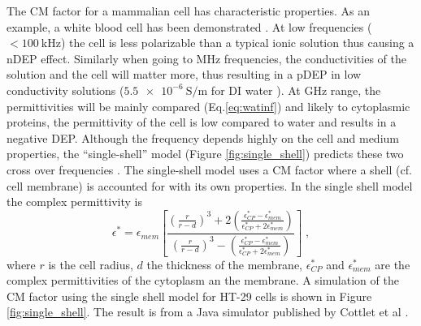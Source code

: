 \documentclass[final]{jyflluk}
\begin{document}
The CM factor for a mammalian cell has characteristic properties. As an example, a white blood cell has been demonstrated \cite{voldman_electrical_2006}. At low frequencies ($<\SI{100}{\kilo \Hz}$) the cell is less polarizable than a typical ionic solution thus causing a nDEP effect. Similarly when going to MHz frequencies, the conductivities of the solution and the cell will matter more, thus resulting in a pDEP in low conductivity solutions ($\SI{5.5e-6}{ \siemens \per \metre}$ for DI water \cite{pashley2005gassed}). At GHz range, the permittivities will be mainly compared (Eq.\ref{eq:watinf}) and likely to cytoplasmic proteins, the permittivity of the cell is low compared to water and results in a negative DEP.  Although the frequency depends highly on the cell and medium properties, the “single-shell” model (Figure \ref{fig:single_shell}) predicts these two cross over frequencies \cite{voldman_electrical_2006,pethig_review_2010,  cottet_mydep_2019, cetin_dielectrophoresis_2011}. The single-shell model uses a CM factor where a shell (cf. cell membrane) is accounted for with its own properties. In the single shell model the complex permittivity is
%
\begin{equation}
   \label{eq:shellmodel}
   \epsilon^*=\epsilon_{mem} \left[ \frac{\left( \frac{r}{r-d}\right)^3 + 2\left(\frac{\epsilon_{CP}^* - \epsilon_{mem}^*}{\epsilon_{CP}^* + 2\epsilon_{mem}^*} \right)}{\left( \frac{r}{r-d}\right)^3 -\left(\frac{\epsilon_{CP}^* - \epsilon_{mem}^*}{\epsilon_{CP}^* + 2\epsilon_{mem}^*} \right)}        \right] \;,
\end{equation}
%
where $r$ is the cell radius, $d$ the thickness of the membrane, $\epsilon_{CP}^*$ and  $\epsilon_{mem}^*$ are the complex permittivities of the cytoplasm an the membrane. A simulation of the CM factor using the single shell model for HT-29 cells is shown in Figure \ref{fig:single_shell}. The result is from a Java  simulator published by Cottlet et al \cite{cottet_mydep_2019}.
\end{document}
